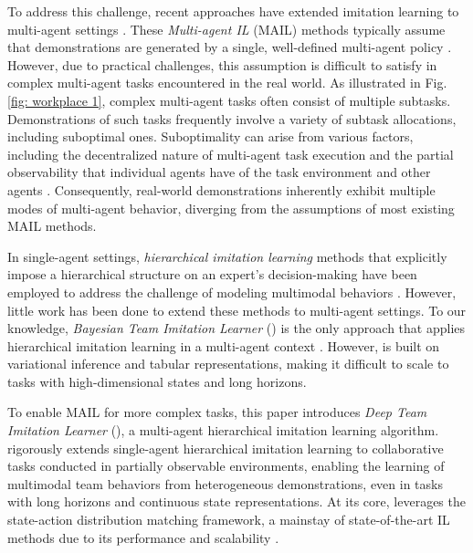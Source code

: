 To address this challenge, recent approaches have extended imitation learning to multi-agent settings \cite{song2018multi,yu2019multi,bhattacharyya2018multi,yang2020bayesian}. These \textit{Multi-agent IL} (MAIL) methods typically assume that demonstrations are generated by a single, well-defined multi-agent policy \cite{lin2019multi}. However, due to practical challenges, this assumption is difficult to satisfy in complex multi-agent tasks encountered in the real world.
As illustrated in Fig. \ref{fig: workplace 1}, complex multi-agent tasks often consist of multiple subtasks. Demonstrations of such tasks frequently involve a variety of subtask allocations, including suboptimal ones. Suboptimality can arise from various factors, including the decentralized nature of multi-agent task execution and the partial observability that individual agents have of the task environment and other agents \cite{reyes2019makes, seo2021towards, seo2025socratic}.
Consequently, real-world demonstrations inherently exhibit multiple modes of multi-agent behavior, diverging from the assumptions of most existing MAIL methods.
\ifarxiv
{}
\else
{}
\fi

In single-agent settings, \textit{hierarchical imitation learning} methods that explicitly impose a hierarchical structure on an expert's decision-making have been employed to address the challenge of modeling multimodal behaviors \cite{unhelkar2019learning,jing2021adversarial,sharma2018directed,seo2024idil,orlov2022factorial, jain2024godice}. However, little work has been done to extend these methods to multi-agent settings. To our knowledge, \textit{Bayesian Team Imitation Learner} (\btil) is the only approach that applies hierarchical imitation learning in a multi-agent context \cite{seo2022semi}. However, \btil is built on variational inference and tabular representations, making it difficult to scale to tasks with high-dimensional states and long horizons.


To enable MAIL for more complex tasks, this paper introduces \textit{Deep Team Imitation Learner} (\ouralg), a multi-agent hierarchical imitation learning algorithm. \ouralg rigorously extends single-agent hierarchical imitation learning to collaborative tasks conducted in partially observable environments, enabling the learning of multimodal team behaviors from heterogeneous demonstrations, even in tasks with long horizons and continuous state representations.
At its core, \ouralg leverages the state-action distribution matching framework, a mainstay of state-of-the-art IL methods due to its performance and scalability \cite{ho2016generative,garg2021iq}. 

